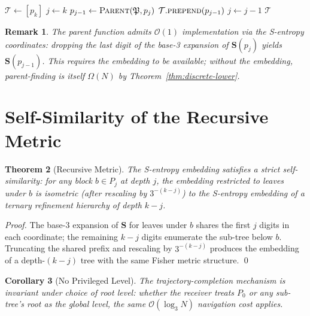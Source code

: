 \documentclass[twocolumn,a4paper]{article}
\newtheorem{theorem}{Theorem}[section]
\newtheorem{corollary}[theorem]{Corollary}
\newtheorem{remark}[theorem]{Remark}
\newcommand{\Stuple}{\mathbf{S}}
\newcommand{\PPart}{\mathfrak{P}}
\newcommand{\Trajec}{\mathcal{T}}
\begin{document}
\begin{algorithm}[!htbp]
\caption{Backward navigation in ternary refinement hierarchy}
\label{alg:backward-nav}
\begin{algorithmic}[1]
\Function{Complete}{$\PPart,p_{k}$}
  \State $\Trajec\gets[p_{k}]$
  \State $j\gets k$
    \State $p_{j-1}\gets\textsc{Parent}(\PPart,p_{j})$
    \State $\Trajec.\textsc{prepend}(p_{j-1})$
    \State $j\gets j-1$
  \EndWhile
  \State \Return $\Trajec$
\EndFunction
\end{algorithmic}
\end{algorithm}

\begin{remark}
The parent function admits $\mathcal{O}(1)$ implementation via the S-entropy coordinates: dropping the last digit of the base-3 expansion of $\Stuple(p_{j})$ yields $\Stuple(p_{j-1})$. This requires the embedding to be available; without the embedding, parent-finding is itself $\Omega(N)$ by Theorem~\ref{thm:discrete-lower}.
\end{remark}

\section{Self-Similarity of the Recursive Metric}
\label{sec:self-similarity}

\begin{theorem}[Recursive Metric]
\label{thm:recursive-metric}
The S-entropy embedding satisfies a strict self-similarity: for any block $b\in P_{j}$ at depth $j$, the embedding restricted to leaves under $b$ is isometric (after rescaling by $3^{-(k-j)}$) to the S-entropy embedding of a ternary refinement hierarchy of depth $k-j$.
\end{theorem}

\begin{proof}
The base-3 expansion of $\Stuple$ for leaves under $b$ shares the first $j$ digits in each coordinate; the remaining $k-j$ digits enumerate the sub-tree below $b$. Truncating the shared prefix and rescaling by $3^{-(k-j)}$ produces the embedding of a depth-$(k-j)$ tree with the same Fisher metric structure. \qed
\end{proof}

\begin{corollary}[No Privileged Level]
\label{cor:no-priv-level}
The trajectory-completion mechanism is invariant under choice of root level: whether the receiver treats $P_{0}$ or any sub-tree's root as the global level, the same $\mathcal{O}(\log_{3}N)$ navigation cost applies.
\end{corollary}
\end{document}
